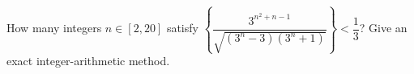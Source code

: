 How many integers $n\in[2,20]$ satisfy $\left \{ \dfrac{3^{n^2+n-1}}{\sqrt{(3^n-3)(3^n+1)}} \right \} < \dfrac{1}{3}$? Give an exact integer-arithmetic method.
